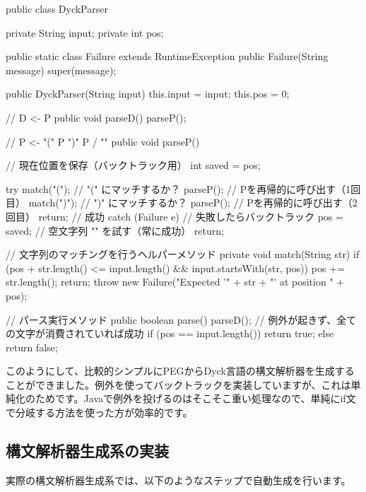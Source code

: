 \begin{codescreen}{}
public class DyckParser {
    private String input;
    private int pos;

    public static class Failure extends RuntimeException {
        public Failure(String message) {
            super(message);
        }
    }
    
    public DyckParser(String input) {
        this.input = input;
        this.pos = 0;
    }
    
    // D <- P
    public void parseD() {
        parseP();
    }
    
    // P <- "(" P ")" P / ""
    public void parseP() {
        // 現在位置を保存（バックトラック用）
        int saved = pos;

        try {
            match("(");  // "(" にマッチするか？
            parseP();  // Pを再帰的に呼び出す（1回目）
            match(")");  // ")" にマッチするか？
            parseP();  // Pを再帰的に呼び出す（2回目）
            return;  // 成功
        } catch (Failure e) {
            // 失敗したらバックトラック
            pos = saved;
            // 空文字列 "" を試す（常に成功）
            return;
        }
    }
    
    // 文字列のマッチングを行うヘルパーメソッド
    private void match(String str) {
        if (pos + str.length() <= input.length() &&
            input.startsWith(str, pos)) {
            pos += str.length();
            return;
        }
        throw new Failure("Expected '" + str + "' at position " + pos);
    }
    
    // パース実行メソッド
    public boolean parse() {
        parseD();
        // 例外が起きず、全ての文字が消費されていれば成功
        if (pos == input.length()) {
            return true;  
        } else {
            return false;
        }
    }
}
\end{codescreen}

このようにして、比較的シンプルにPEGからDyck言語の構文解析器を生成することができました。例外を使ってバックトラックを実装していますが、これは単純化のためです。Javaで例外を投げるのはそこそこ重い処理なので、単純にif文で分岐する方法を使った方が効率的です。

\subsection{構文解析器生成系の実装}

実際の構文解析器生成系では、以下のようなステップで自動生成を行います。


